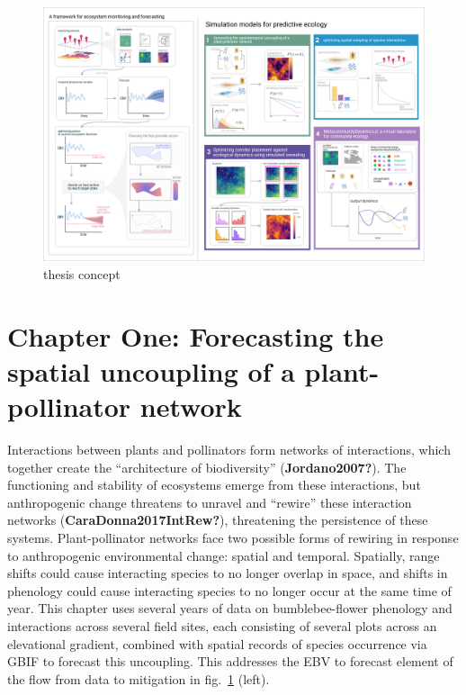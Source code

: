 \documentclass[11pt]{article}
\makeatletter
\def\maxwidth{\ifdim\Gin@nat@width>\linewidth\linewidth
\else\Gin@nat@width\fi}
\let\Oldincludegraphics\includegraphics
\renewcommand{\includegraphics}[1]{\Oldincludegraphics[width=\maxwidth]{#1}}
\makeatother
\begin{document}
\begin{figure}
\hypertarget{fig:thesis}{%
\centering
\includegraphics{./figures/thesisconcept.png}
\caption{thesis concept}\label{fig:thesis}
}
\end{figure}

\hypertarget{chapter-one-forecasting-the-spatial-uncoupling-of-a-plant-pollinator-network}{%
\section{Chapter One: Forecasting the spatial uncoupling of a
plant-pollinator
network}\label{chapter-one-forecasting-the-spatial-uncoupling-of-a-plant-pollinator-network}}

Interactions between plants and pollinators form networks of
interactions, which together create the ``architecture of biodiversity''
(\textbf{Jordano2007?}). The functioning and stability of ecosystems
emerge from these interactions, but anthropogenic change threatens to
unravel and ``rewire'' these interaction networks
(\textbf{CaraDonna2017IntRew?}), threatening the persistence of these
systems. Plant-pollinator networks face two possible forms of rewiring
in response to anthropogenic environmental change: spatial and temporal.
Spatially, range shifts could cause interacting species to no longer
overlap in space, and shifts in phenology could cause interacting
species to no longer occur at the same time of year. This chapter uses
several years of data on bumblebee-flower phenology and interactions
across several field sites, each consisting of several plots across an
elevational gradient, combined with spatial records of species
occurrence via GBIF to forecast this uncoupling. This addresses the EBV
to forecast element of the flow from data to mitigation in
fig.~\ref{fig:thesis} (left).
\end{document}
